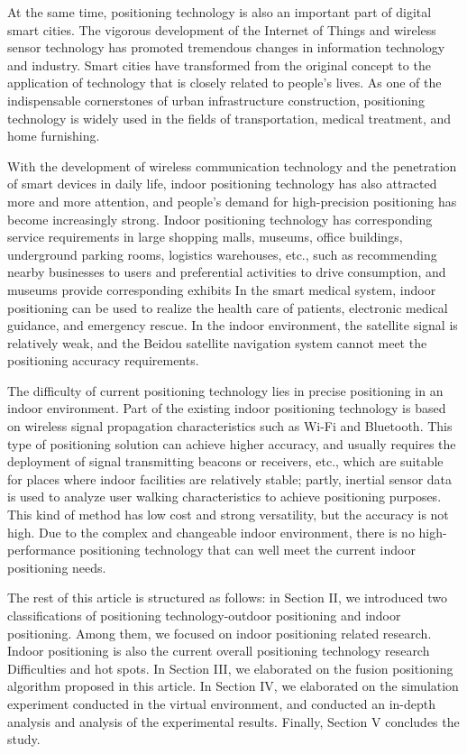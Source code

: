 \documentclass[conference]{IEEEtran}
\begin{document}
At the same time, positioning technology is also an important part of digital smart cities. The vigorous development of the Internet of Things and wireless sensor technology has promoted tremendous changes in information technology and industry. Smart cities have transformed from the original concept to the application of technology that is closely related to people's lives. As one of the indispensable cornerstones of urban infrastructure construction, positioning technology is widely used in the fields of transportation, medical treatment, and home furnishing.

With the development of wireless communication technology and the penetration of smart devices in daily life, indoor positioning technology has also attracted more and more attention, and people's demand for high-precision positioning has become increasingly strong. \cite{intro-cloud} Indoor positioning technology has corresponding service requirements in large shopping malls, museums, office buildings, underground parking rooms, logistics warehouses, etc., such as recommending nearby businesses to users and preferential activities to drive consumption, and museums provide corresponding exhibits In the smart medical system, indoor positioning can be used to realize the health care of patients, electronic medical guidance, and emergency rescue. In the indoor environment, the satellite signal is relatively weak, and the Beidou satellite navigation system cannot meet the positioning accuracy requirements.

The difficulty of current positioning technology lies in precise positioning in an indoor environment. Part of the existing indoor positioning technology is based on wireless signal propagation characteristics such as Wi-Fi and Bluetooth. This type of positioning solution can achieve higher accuracy, and usually requires the deployment of signal transmitting beacons or receivers, etc., which are suitable for places where indoor facilities are relatively stable; partly, inertial sensor data is used to analyze user walking characteristics to achieve positioning purposes. This kind of method has low cost and strong versatility, but the accuracy is not high. Due to the complex and changeable indoor environment, there is no high-performance positioning technology that can well meet the current indoor positioning needs.

The rest of this article is structured as follows: in Section II, we introduced two classifications of positioning technology-outdoor positioning and indoor positioning. Among them, we focused on indoor positioning related research. Indoor positioning is also the current overall positioning technology research Difficulties and hot spots. In Section III, we elaborated on the fusion positioning algorithm proposed in this article. In Section IV, we elaborated on the simulation experiment conducted in the virtual environment, and conducted an in-depth analysis and analysis of the experimental results. Finally, Section V concludes the study.
\end{document}
